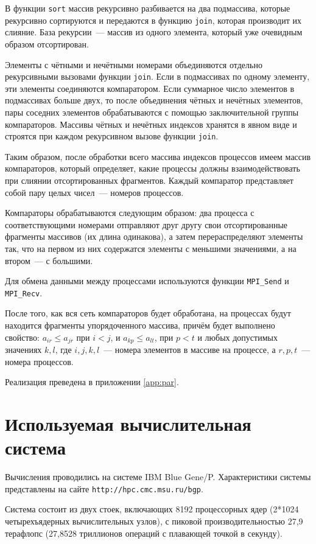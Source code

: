 \documentclass[oneside,final,14pt]{extreport}
\begin{document}
В функции \texttt{sort} массив рекурсивно разбивается на два подмассива,
которые рекурсивно сортируются и передаются в функцию \texttt{join}, которая
производит их слияние. База рекурсии~--- массив из одного элемента,
который уже очевидным образом отсортирован.

Элементы с чётными и нечётными номерами объединяются отдельно рекурсивными
вызовами функции \texttt{join}. Если в подмассивах по одному элементу,
эти элементы соединяются компаратором. Если суммарное число элементов в
подмассивах больше двух, то после объединения чётных и нечётных элементов,
пары соседних элементов обрабатываются с помощью заключительной
группы компараторов. Массивы чётных и нечётных индексов хранятся в явном виде
и строятся при каждом рекурсивном вызове функции \texttt{join}.

Таким образом, после обработки всего массива индексов процессов имеем
массив компараторов, который определяет, какие процессы должны взаимодействовать
при слиянии отсортированных фрагментов. Каждый компаратор представляет собой
пару целых чисел~--- номеров процессов.

Компараторы обрабатываются следующим образом: два процесса с соответствующими
номерами отправляют друг другу свои отсортированные фрагменты массивов (их
длина одинакова), а затем перераспределяют элементы так, что на первом из
них содержатся элементы с меньшими значениями, а на втором~--- с большими.

Для обмена данными между процессами используются функции \texttt{MPI\_Send}
и \texttt{MPI\_Recv}.

После того, как вся сеть компараторов будет обработана, на процессах
будут находится фрагменты упорядоченного массива, причём будет выполнено
свойство: $a_{ir} \leq a_{jr}$ при $i < j$, и $a_{kp} \leq a_{lt}$, при
$p < t$ и любых допустимых значениях $k, l$, где $i, j, k, l$~--- номера
элементов в массиве на процессе, а $r, p, t$~--- номера процессов.

Реализация преведена в приложении \ref{app:par}.

\chapter*{Используемая вычислительная система}

Вычисления проводились на системе IBM Blue Gene/P.
Характеристики системы представлены на сайте \verb|http://hpc.cmc.msu.ru/bgp|.

Система состоит из двух стоек, включающих 8192 процессорных ядер
(2*1024 четырехъядерных вычислительных узлов), с пиковой производительностью
27,9 терафлопс (27,8528 триллионов операций с плавающей точкой в секунду).
\end{document}
